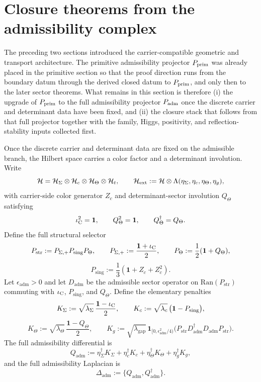 \section{Closure theorems from the admissibility complex}
\label{sec:closure-theorems}

The preceding two sections introduced the carrier-compatible geometric and transport architecture.
The primitive admissibility projector $P_{\mathrm{prim}}$ was already placed in the primitive section so
that the proof direction runs from the boundary datum through the derived closed datum to $P_{\mathrm{prim}}$, and only then to the later
sector theorems. What remains in this section is therefore (i) the upgrade of $P_{\mathrm{prim}}$ to the
full admissibility projector $P_{\mathrm{adm}}$ once the discrete carrier and determinant data have been
fixed, and (ii) the closure stack that follows from that full projector together with the family,
Higgs, positivity, and reflection-stability inputs collected first.

\begin{definition}
\label{def:full-admissibility-complex}
Once the discrete carrier and determinant data are fixed on the admissible branch, the Hilbert
space carries a color factor and a determinant involution. Write
\[
\mathcal H=\mathcal H_{\Sigma}\otimes\mathcal H_c\otimes\mathcal H_\Theta\otimes\mathcal H_t,
\qquad
\mathcal H_{\mathrm{ext}}
:=
\mathcal H\otimes\Lambda(\eta_\Sigma,\eta_c,\eta_\Theta,\eta_g),
\]
with carrier-side color generator $Z_c$ and determinant-sector involution $Q_\Theta$ satisfying
\[
\iota_{\mathrm C}^2=\mathbf 1,
\qquad
Q_\Theta^2=\mathbf 1,
\qquad
Q_\Theta^\dagger=Q_\Theta.
\]
Define the full structural selector
\[
P_{\mathrm{str}}:=P_{\Sigma,+}P_{\mathrm{sing}}P_\Theta,
\qquad
P_{\Sigma,+}:=\frac{\mathbf 1+\iota_{\mathrm C}}{2},
\qquad
P_\Theta:=\frac12(\mathbf 1+Q_\Theta),
\]
\[
P_{\mathrm{sing}}:=\frac13(\mathbf 1+Z_c+Z_c^2).
\]
Let $\epsilon_{\mathrm{adm}}>0$ and let $D_{\mathrm{adm}}$ be the admissible sector operator on
$\mathrm{Ran}(P_{\mathrm{str}})$ commuting with $\iota_{\mathrm C}$, $P_{\mathrm{sing}}$, and $Q_\Theta$.
Define the elementary penalties
\[
K_\Sigma:=\sqrt{\lambda_\Sigma}\,\frac{\mathbf 1-\iota_{\mathrm C}}{2},
\qquad
K_c:=\sqrt{\lambda_c}\,\bigl(\mathbf 1-P_{\mathrm{sing}}\bigr),
\]
\[
K_\Theta:=\sqrt{\lambda_\Theta}\,\frac{\mathbf 1-Q_\Theta}{2},
\qquad
K_g:=\sqrt{\lambda_{\mathrm{gap}}}\,\mathbf 1_{[0,\epsilon_{\mathrm{adm}}^2/4)}\!\bigl(P_{\mathrm{str}}D_{\mathrm{adm}}^\dagger D_{\mathrm{adm}}P_{\mathrm{str}}\bigr).
\]
The full admissibility differential is
\[
Q_{\mathrm{adm}}
:=
\eta_\Sigma^\dagger K_\Sigma
+\eta_c^\dagger K_c
+\eta_\Theta^\dagger K_\Theta
+\eta_g^\dagger K_g,
\]
and the full admissibility Laplacian is
\[
\Delta_{\mathrm{adm}}:=\{Q_{\mathrm{adm}},Q_{\mathrm{adm}}^\dagger\}.
\]
\end{definition}

